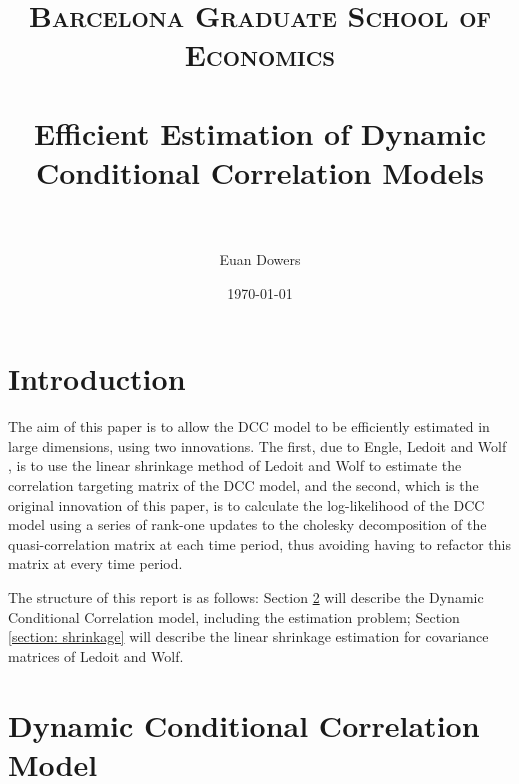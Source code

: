 \documentclass{article} %
\title{
\normalfont \normalsize
\textsc{Barcelona Graduate School of Economics} \\ [20pt] %
\horrule{0.5pt} \\[0.1cm] %
\Large Efficient Estimation of Dynamic Conditional Correlation Models \\ %
\horrule{0.5pt} \\[0.1cm] %
}
\author{Euan Dowers} %
\date{\normalsize\today} %
\numberwithin{equation}{section} %
\numberwithin{figure}{section} %
\numberwithin{table}{section} %
\begin{document}
\maketitle %

\tableofcontents

\pagebreak


\section{Introduction}

The aim of this paper is to allow the DCC model to be efficiently estimated in large dimensions, using two innovations. The first, due to Engle, Ledoit and Wolf \cite{engle ledoit and wolf}, is to use the linear shrinkage method of Ledoit and Wolf \cite{ledoit and wolf} to estimate the correlation targeting matrix of the DCC model, and the second, which is the original innovation of this paper, is to calculate the log-likelihood of the DCC model using a series of rank-one updates to the cholesky decomposition of the quasi-correlation matrix at each time period, thus avoiding having to refactor this matrix at every time period.

The structure of this report is as follows: Section \ref{section: dcc} will describe the Dynamic Conditional Correlation model, including the estimation problem; Section \ref{section: shrinkage} will describe the linear shrinkage estimation for covariance matrices of Ledoit and Wolf.


\section{Dynamic Conditional Correlation Model} \label{section: dcc}
\end{document}
